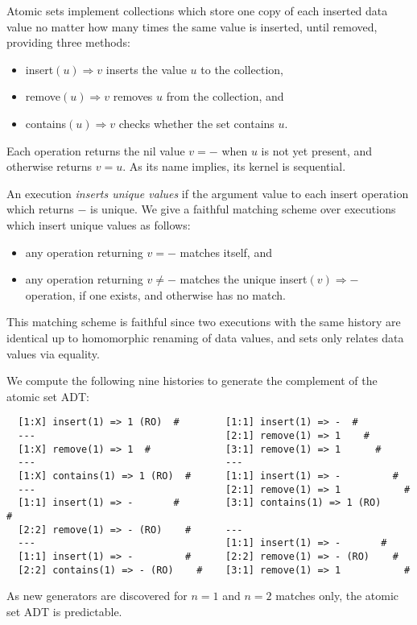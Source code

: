Atomic sets implement collections which store one copy of each inserted data
value no matter how many times the same value is inserted, until removed,
providing three methods:
\begin{itemize}

  \item insert$(u) \Rightarrow v$ inserts the value $u$ to the collection,

  \item remove$(u) \Rightarrow v$ removes $u$ from the collection, and

  \item contains$(u) \Rightarrow v$ checks whether the set contains $u$.

\end{itemize}
Each operation returns the nil value $v = -$ when $u$ is not yet
present, and otherwise returns $v = u$. As its name implies, its kernel is
sequential.

An execution \emph{inserts unique values} if the argument value to each insert
operation which returns $-$ is unique. We give a faithful matching
scheme over executions which insert unique values as follows:
\begin{itemize}

  \item any operation returning $v = -$ matches itself, and

  \item any operation returning $v \neq -$ matches the unique
  insert$(v) \Rightarrow -$ operation, if one exists, and otherwise
  has no match.

\end{itemize}
This matching scheme is faithful since two executions with the same history are
identical up to homomorphic renaming of data values, and sets only relates data
values via equality.

We compute the following nine histories to generate the complement of the
atomic set ADT:
\begin{verbatim}
  [1:X] insert(1) => 1 (RO)  #        [1:1] insert(1) => -  #
  ---                                 [2:1] remove(1) => 1    #
  [1:X] remove(1) => 1  #             [3:1] remove(1) => 1      #
  ---                                 ---
  [1:X] contains(1) => 1 (RO)  #      [1:1] insert(1) => -         #
  ---                                 [2:1] remove(1) => 1           #
  [1:1] insert(1) => -       #        [3:1] contains(1) => 1 (RO)      #
  [2:2] remove(1) => - (RO)    #      ---
  ---                                 [1:1] insert(1) => -       #
  [1:1] insert(1) => -         #      [2:2] remove(1) => - (RO)    #
  [2:2] contains(1) => - (RO)    #    [3:1] remove(1) => 1           #
\end{verbatim}
As new generators are discovered for $n=1$ and $n=2$ matches only, the atomic
set ADT is predictable.

